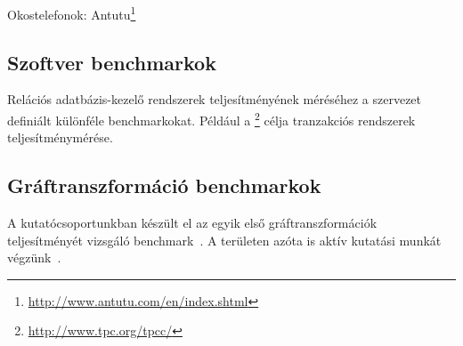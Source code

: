 Okostelefonok: Antutu\footnote{\url{http://www.antutu.com/en/index.shtml}}


\subsection{Szoftver benchmarkok}

Relációs adatbázis-kezelő rendszerek teljesítményének méréséhez a  szervezet definiált különféle benchmarkokat. Például a \footnote{\url{http://www.tpc.org/tpcc/}} célja tranzakciós  rendszerek teljesítménymérése.

\subsection{Gráftranszformáció benchmarkok}

A kutatócsoportunkban készült el az egyik első gráftranszformációk teljesítményét vizsgáló benchmark~\cite{vlhcc05_vsv}. A területen azóta is aktív kutatási munkát végzünk~\cite{DBLP:conf/staf/SzarnyasSRV15}.


